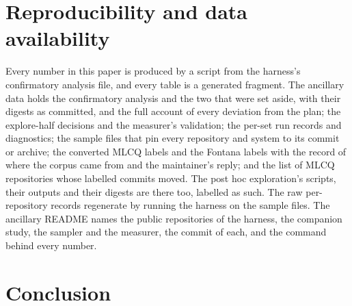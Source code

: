 \documentclass[11pt,a4paper]{article}
\begin{document}
\section{Reproducibility and data availability}
\label{sec:repro}

Every number in this paper is produced by a script from the harness's
confirmatory analysis file, and every table is a generated fragment. The
ancillary data holds the confirmatory analysis and the two that were set
aside, with their digests as committed, and the full account of every
deviation from the plan; the explore-half decisions and the
measurer's validation; the per-set run records and diagnostics; the sample
files that pin every repository and system to its commit or archive; the
converted MLCQ labels and the Fontana labels with the record of where the
corpus came from and the maintainer's reply; and the list of MLCQ
repositories whose labelled commits moved. The post hoc exploration's scripts, their outputs and their digests are
there too, labelled as such. The raw per-repository records regenerate by running the
harness on the sample files. The ancillary README
names the public repositories of the harness, the companion study, the
sampler and the measurer, the commit of each, and the command behind every
number.

\section{Conclusion}
\end{document}
